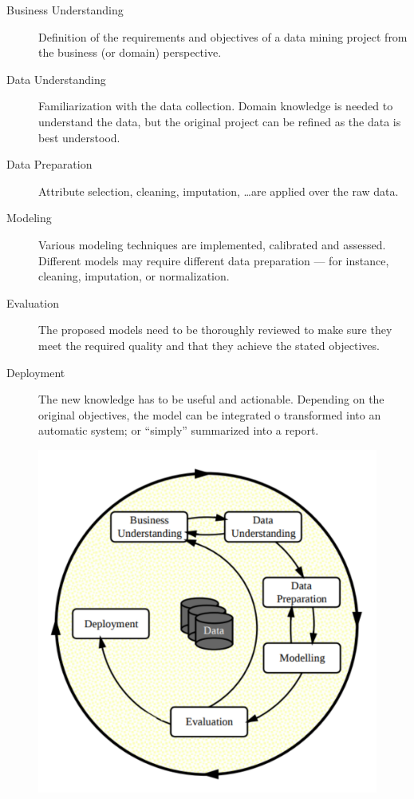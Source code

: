 \begin{description}
    \item[Business Understanding] Definition of the requirements and objectives of a data mining project
        from the business (or domain) perspective.
    \item[Data Understanding] Familiarization with the data collection. Domain knowledge
        is needed to understand the data, but the original project can be refined as the data is best understood.
    \item[Data Preparation] Attribute selection, cleaning, imputation, \ldots are applied over the raw data.
    \item[Modeling] Various modeling techniques are implemented, calibrated and assessed. Different models may require different data preparation ---
    for instance, cleaning, imputation, or normalization.
    \item[Evaluation] The proposed models need to be thoroughly reviewed to make sure they meet the required quality and that they achieve the stated
    objectives.
    \item[Deployment] The new knowledge has to be useful and actionable.
    Depending on the original objectives, the model can be integrated 
    o transformed into an automatic system; or ``simply'' summarized into a report.
\end{description}

\begin{figure}[htb]
    \centering
    \includegraphics[width=0.8\linewidth]{images/1_introduction/crisp-dm.pdf}
    \caption{}
    \label{fig:crispdm}
\end{figure}

